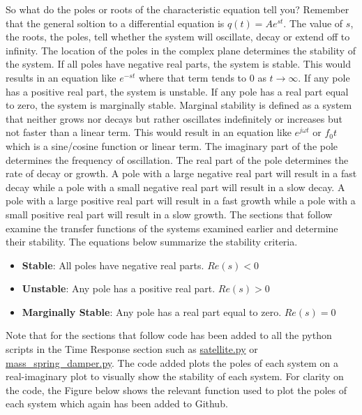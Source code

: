 So what do the poles or roots of the characteristic equation tell you? Remember that the general soltion to a differential equation is $q(t) = Ae^{st}$. The value of $s$, the roots, the poles, tell whether the system will oscillate, decay or extend off to infinity. The location of the poles in the complex plane determines the stability of the system. If all poles have negative real parts, the system is stable. This would results in an equation like $e^{-st}$ where that term tends to 0 as $t \rightarrow \infty$. If any pole has a positive real part, the system is unstable. If any pole has a real part equal to zero, the system is marginally stable. Marginal stability is defined as a system that neither grows nor decays but rather oscillates indefinitely or increases but not faster than a linear term. This would result in an equation like $e^{j\omega t}$  or $f_0 t$ which is a sine/cosine function or linear term. The imaginary part of the pole determines the frequency of oscillation. The real part of the pole determines the rate of decay or growth. A pole with a large negative real part will result in a fast decay while a pole with a small negative real part will result in a slow decay. A pole with a large positive real part will result in a fast growth while a pole with a small positive real part will result in a slow growth. The sections that follow examine the transfer functions of the systems examined earlier and determine their stability. The equations below summarize the stability criteria.
\begin{itemize}
    \item {\bf Stable}: All poles have negative real parts. $Re(s) < 0$
    \item {\bf Unstable}: Any pole has a positive real part. $Re(s) > 0$
    \item {\bf Marginally Stable}: Any pole has a real part equal to zero. $Re(s) = 0$
\end{itemize}
Note that for the sections that follow code has been added to all the python scripts in the Time Response section such as \href{https://github.com/cmontalvo251/Python/blob/master/controls/satellite.py}{satellite.py} or \href{https://github.com/cmontalvo251/Python/blob/master/controls/mass_spring_damper.py}{mass\_spring\_damper.py}. The code added plots the poles of each system on a real-imaginary plot to visually show the stability of each system. For clarity on the code, the Figure below shows the relevant function used to plot the poles of each system which again has been added to Github.
